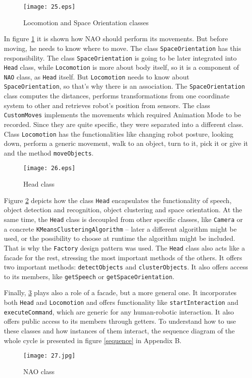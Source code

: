         \begin{figure}[b!]
            \centering
            \texttt{[image: 25.eps]} 
            \caption{Locomotion and Space Orientation classes}
            \label{locomotion}
        \end{figure}

               In figure \ref{locomotion} it is shown how NAO should perform its movements. But before moving, he needs to know where to move. The class \verb|SpaceOrientation| has this responsibility. The class \verb|SpaceOrientation| is going to be later integrated into \verb|Head| class, while \verb|Locomotion| is more about body itself, so it is a component of \verb|NAO| class, as \verb|Head| itself. But \verb|Locomotion| needs to know about \verb|SpaceOrientation|, so that's why there is an association. The \verb|SpaceOrientation| class computes the distances, performs transformations from one coordinate system to other and retrieves robot's position from sensors. The class \verb|CustomMoves| implements the movements which required Animation Mode to be recorded. Since they are quite specific, they were separated into a different class. Class \verb|Locomotion| has the functionalities like changing robot posture, looking down, perform a generic movement, walk to an object, turn to it, pick it or give it and the method \verb|moveObjects|.
           \begin{figure}[b!]
            \centering
            \texttt{[image: 26.eps]} 
            \caption{Head class}
            \label{head}
        \end{figure}
        Figure \ref{head} depicts how the class \verb|Head| encapsulates the functionality of speech, object detection and recognition, object clustering and space orientation. At the same time, the \verb|Head| class is decoupled from other specific classes, like \verb|Camera| or a concrete \verb|KMeansClusteringAlgorithm| -- later a different algorithm might be used, or the possibility to choose at runtime the algorithm might be included. That is why the \verb|Factory| design pattern was used. The \verb|Head| class also acts like a facade for the rest, stressing the most important methods of the others. It offers two important methods: \verb|detectObjects| and \verb|clusterObjects|. It also offers access to its members, like \verb|getSpeech| or \verb|getSpaceOrientation|.

        Finally, \ref{naoClass} plays also a role of a facade, but a more general one. It incorporates both \verb|Head| and \verb|Locomotion| and offers functionality like \verb|startInteraction| and \verb|executeCommand|, which are generic for any human-robotic interaction. It also offers public access to its members through getters. 
                To understand how to use these classes and how instances of them interact, the sequence diagram of the whole cycle is presented in figure \ref{sequence} in  Appendix B.
        \begin{figure}[h!]
            \centering
            \texttt{[image: 27.jpg]} 
            \caption{NAO class}
            \label{naoClass}
        \end{figure}
 


